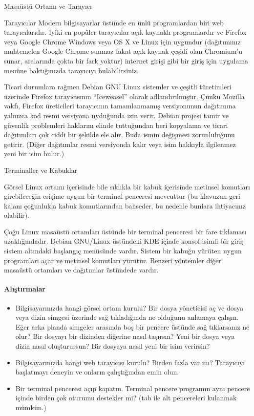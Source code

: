 \begin{section}{Masaüstü Ortamı ve Tarayıcı}
\begin{subsection}{Tarayıcılar}
Modern bilgisayarlar üstünde en ünlü programlardan biri web tarayıcılarıdır. İyiki en popüler tarayıcılar açık kaynaklı programlardır ve Firefox veya Google Chrome Windows veya OS X ve Linux için uygundur (dağıtımınız muhtemelen Google Chrome sunmaz fakat açık kaynak çeşidi olan Chromium’u sunar, aralarında çokta bir fark yoktur) internet girişi gibi bir giriş için uygulama menüne baktığınızda tarayıcıyı bulabilirsiniz.

Ticari durumlara rağmen Debian GNU Linux sistemler ve çeşitli türetimleri üzerinde Firefox tarayıcısının  “Iceweasel” olarak adlandırılmıştır. Çünkü Mozilla vakfı, Firefox üreticileri tarayıcının tamamlanmamış versiyonunun dağıtımına yalnızca kod resmi versiyona  uyduğunda izin verir. Debian projesi tamir ve güvenlik problemleri haklarını elinde tuttuğundan beri kopyalama ve ticari dağıtımları çok ciddi bir şekilde ele alır. Buda ismin değişmesi zorunluluğunu getirir. (Diğer dağıtımlar resmi versiyonda kalır veya isim hakkıyla ilgilenmez yeni bir isim bulur.) 
\end{subsection}
\begin{subsection}{Terminaller ve Kabuklar}

Görsel Linux ortamı içerisinde bile sıklıkla bir kabuk içerisinde metinsel komutları girebileceğin erişime uygun bir terminal penceresi mevcuttur (bu klavuzun geri kalanı çoğunlukla kabuk komutlarından bahseder, bu nedenle bunlara ihtiyacınız olabilir).

Çoğu Linux masaüstü ortamları üstünde bir terminal penceresi bir fare tıklaması uzaklığındadır. Debian GNU/Linux üstündeki KDE içinde konsol isimli bir giriş sistem altındaki başlangıç menüsünde vardır. Sistem bir kabuğu yürüten uygun programları açar ve metinsel komutları yürütür. Benzeri yöntemler diğer masaüstü ortamları ve dağıtımlar üstündede vardır.
\end{subsection}

\paragraph{Alıştırmalar}{
\begin{itemize}
 \item Bilgisayarınızda hangi görsel ortam kurulu? Bir dosya yöneticisi aç ve dosya veya dizin simgesi üzerinde sağ tıkladığında ne olduğunu anlamaya çalışın. Eğer arka planda simgeler arasında boş bir pencere üstünde sağ tıklarsanız ne olur? Bir dosyayı bir dizinden diğerine nasıl taşırsın? Yeni bir dosya veya dizin nasıl oluşturursun? Bir dosyaya nasıl yeni bir isim verirsin?
 \item Bilgisayarınızda hangi web tarayıcısı kurulu? Birden fazla var mı? Tarayıcıyı başlatmayı deneyin ve onların çalıştığından emin olun.
 \item Bir terminal penceresi açıp kapatın. Terminal pencere programın aynı pencere içinde birden çok oturumu destekler mi? (tab ile alt pencereleri kulanmak mümkün.)
\end{itemize}}
\end{section}
